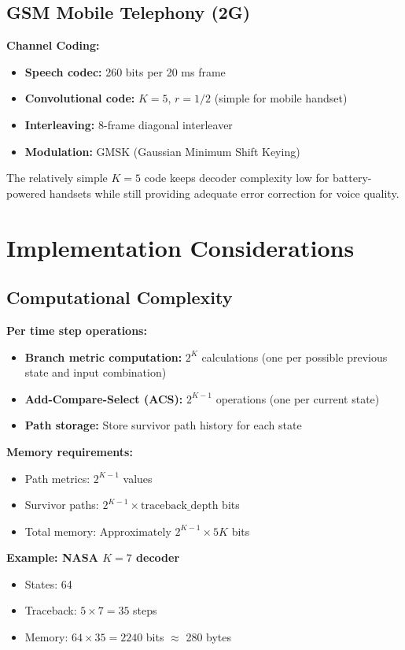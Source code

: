 \subsection{GSM Mobile Telephony (2G)}

\textbf{Channel Coding:}
\begin{itemize}
\item \textbf{Speech codec:} 260 bits per 20 ms frame
\item \textbf{Convolutional code:} $K=5$, $r=1/2$ (simple for mobile handset)
\item \textbf{Interleaving:} 8-frame diagonal interleaver
\item \textbf{Modulation:} GMSK (Gaussian Minimum Shift Keying)
\end{itemize}

The relatively simple $K=5$ code keeps decoder complexity low for battery-powered handsets while still providing adequate error correction for voice quality.

\section{Implementation Considerations}

\subsection{Computational Complexity}

\textbf{Per time step operations:}
\begin{itemize}
\item \textbf{Branch metric computation:} $2^K$ calculations (one per possible previous state and input combination)
\item \textbf{Add-Compare-Select (ACS):} $2^{K-1}$ operations (one per current state)
\item \textbf{Path storage:} Store survivor path history for each state
\end{itemize}

\textbf{Memory requirements:}
\begin{itemize}
\item Path metrics: $2^{K-1}$ values
\item Survivor paths: $2^{K-1} \times \text{traceback\_depth}$ bits
\item Total memory: Approximately $2^{K-1} \times 5K$ bits
\end{itemize}

\textbf{Example: NASA $K=7$ decoder}
\begin{itemize}
\item States: 64
\item Traceback: $5 \times 7 = 35$ steps
\item Memory: $64 \times 35 = 2240$ bits $\approx$ 280 bytes
\end{itemize}

